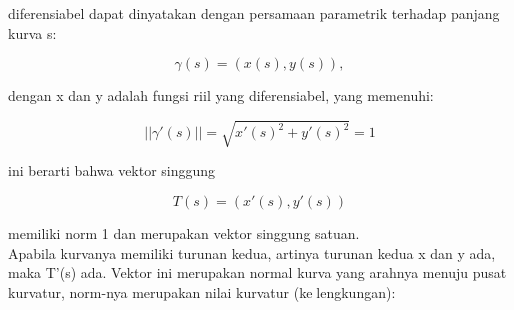 \documentclass[12pt,arial,letterpaper]{book}
\begin{document}
\begin{eulernootebook}
\begin{eulercomment}
\begin{eulercomment}
\begin{eulernootebook}
\begin{eulercomment}
\begin{eulercomment}
\begin{eulercomment}
\begin{eulercomment}
\begin{eulercomment}
\begin{eulercomment}
\begin{eulernotebook}
\begin{eulercomment}
\begin{eulercomment}
\begin{eulercomment}
\begin{eulercomment}
\begin{eulercomment}
\begin{eulercomment}
\begin{eulercomment}
\begin{eulercomment}
\begin{eulercomment}
\begin{eulercomment}
\begin{eulercomment}
\begin{eulercomment}
\begin{eulercomment}
\begin{eulercomment}
\begin{eulercomment}
\begin{eulercomment}
\begin{eulercomment}
\begin{eulercomment}
\begin{eulercomment}
\begin{eulercomment}
\begin{eulercomment}
diferensiabel dapat dinyatakan dengan persamaan parametrik terhadap
panjang kurva s:

\end{eulercomment}
\begin{eulerformula}
\[
\gamma(s)=(x(s),y(s)),
\]
\end{eulerformula}
\begin{eulercomment}
dengan x dan y adalah fungsi riil yang diferensiabel, yang memenuhi:

\end{eulercomment}
\begin{eulerformula}
\[
||\gamma'(s)||=\sqrt{x'(s)^2+y'(s)^2}=1
\]
\end{eulerformula}
\begin{eulercomment}
ini berarti bahwa vektor singgung

\end{eulercomment}
\begin{eulerformula}
\[
T(s)=(x'(s),y'(s))
\]
\end{eulerformula}
\begin{eulercomment}
memiliki norm 1 dan merupakan vektor singgung satuan.\\
Apabila kurvanya memiliki turunan kedua, artinya turunan kedua x dan y
ada, maka T’(s) ada. Vektor ini merupakan normal kurva yang arahnya
menuju pusat kurvatur, norm-nya merupakan nilai kurvatur
(kelengkungan):


\end{eulercomment}
\end{eulercomment}
\end{eulercomment}
\end{eulercomment}
\end{eulercomment}
\end{eulercomment}
\end{eulercomment}
\end{eulercomment}
\end{eulercomment}
\end{eulercomment}
\end{eulercomment}
\end{eulercomment}
\end{eulercomment}
\end{eulercomment}
\end{eulercomment}
\end{eulercomment}
\end{eulercomment}
\end{eulercomment}
\end{eulercomment}
\end{eulercomment}
\end{eulercomment}
\end{eulernotebook}
\end{eulercomment}
\end{eulercomment}
\end{eulercomment}
\end{eulercomment}
\end{eulercomment}
\end{eulercomment}
\end{eulernootebook}
\end{eulercomment}
\end{eulercomment}
\end{eulernootebook}
\end{document}
